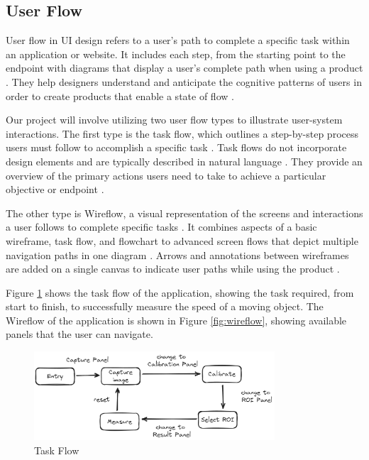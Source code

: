 \subsection{User Flow}
\label{subsec:user-flow}

User flow in UI design refers to a user's path to complete a specific task within an application or website. It includes each step, from the starting point to the endpoint with diagrams that display a user's complete path when using a product \cite{Browne_2023}. They help designers understand and anticipate the cognitive patterns of users in order to create products that enable a state of flow \cite{Browne_2023}.

Our project will involve utilizing two user flow types to illustrate user-system interactions. The first type is the task flow, which outlines a step-by-step process users must follow to accomplish a specific task \cite{Trigo_2023}. Task flows do not incorporate design elements and are typically described in natural language \cite{Trigo_2023}. They provide an overview of the primary actions users need to take to achieve a particular objective or endpoint \cite{Rahul_2022}.

The other type is Wireflow, a visual representation of the screens and interactions a user follows to complete specific tasks \cite{Trigo_2023}. It combines aspects of a basic wireframe, task flow, and flowchart to advanced screen flows that depict multiple navigation paths in one diagram \cite{Trigo_2023}. Arrows and annotations between wireframes are added on a single canvas to indicate user paths while using the product \cite{Angeles}.

Figure \ref{fig:task-flow} shows the task flow of the application, showing the task required, from start to finish, to successfully measure the speed of a moving object. The Wireflow of the application is shown in Figure \ref{fig:wireflow}, showing available panels that the user can navigate.

\begin{figure}[!ht]
    \centering
    \includegraphics[width=0.8\textwidth]{texs/Part2/chapter3/image/taskflow.png}
    \caption{Task Flow}
    \label{fig:task-flow}
\end{figure}

